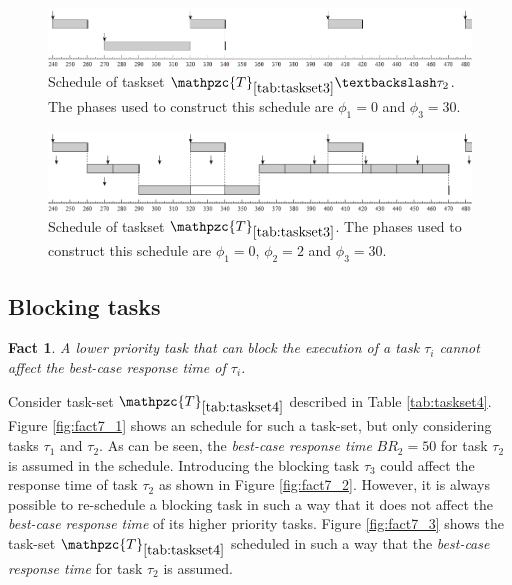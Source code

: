 \documentclass[fleqn]{article}
\newtheorem{fact}{Fact}
\begin{document}
\begin{figure}[H]
	\centering
	\includegraphics[width=0.9\linewidth]{figures/fact6_1}
	\caption{Schedule of taskset $\mathpzc{T}_{\ref{tab:taskset3}} \textbackslash \tau_2$. The phases used to construct this schedule are $\phi_1 = 0$ and $\phi_3 = 30$.}
	\label{fig:fact6_1}
\end{figure}

\begin{figure}[H]
	\centering
	\includegraphics[width=0.9\linewidth]{figures/fact6_2}
	\caption{Schedule of taskset $\mathpzc{T}_{\ref{tab:taskset3}}$. The phases used to construct this schedule are $\phi_1 = 0$, $\phi_2 = 2$ and $\phi_3 = 30$.}
	\label{fig:fact6_2}
\end{figure}

\subsection{Blocking tasks}

\begin{fact}
	A lower priority task that can block the execution of a task $\tau_i$ cannot affect the \textit{best-case response time} of $\tau_i$.
\end{fact}

Consider task-set $\mathpzc{T}_{\ref{tab:taskset4}}$ described in Table \ref{tab:taskset4}. Figure \ref{fig:fact7_1} shows an schedule for such a task-set, but only considering tasks $\tau_1$ and $\tau_2$. As can be seen, the \textit{best-case response time} $BR_2=50$ for task $\tau_2$ is assumed in the schedule. Introducing the blocking task $\tau_3$ could affect the response time of task $\tau_2$ as shown in Figure \ref{fig:fact7_2}. However, it is always possible to re-schedule a blocking task in such a way that it does not affect the \textit{best-case response time} of its higher priority tasks. Figure \ref{fig:fact7_3} shows the task-set $\mathpzc{T}_{\ref{tab:taskset4}}$ scheduled in such a way that the \textit{best-case response time} for task $\tau_2$ is assumed.
\end{document}
